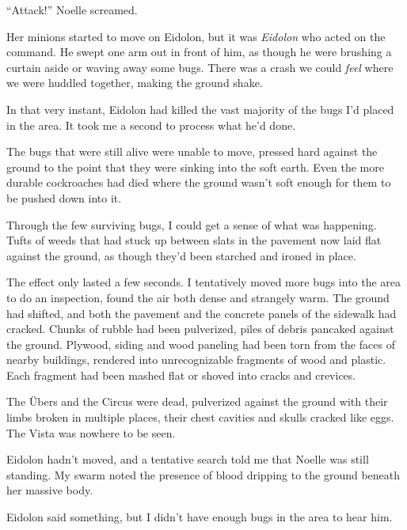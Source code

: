 ``Attack!'' Noelle screamed.



Her minions started to move on Eidolon, but it was \emph{Eidolon} who acted on the command.  He swept one arm out in front of him, as though he were brushing a curtain aside or waving away some bugs.  There was a crash we could \emph{feel} where we were huddled together, making the ground shake.



In that very instant, Eidolon had killed the vast majority of the bugs I'd placed in the area.  It took me a second to process what he'd done.



The bugs that were still alive were unable to move, pressed hard against the ground to the point that they were sinking into the soft earth.  Even the more durable cockroaches had died where the ground wasn't soft enough for them to be pushed down into it.



Through the few surviving bugs, I could get a sense of what was happening.  Tufts of weeds that had stuck up between slats in the pavement now laid flat against the ground, as though they'd been starched and ironed in place.



The effect only lasted a few seconds.  I tentatively moved more bugs into the area to do an inspection, found the air both dense and strangely warm.  The ground had shifted, and both the pavement and the concrete panels of the sidewalk had cracked.  Chunks of rubble had been pulverized, piles of debris pancaked against the ground.  Plywood, siding and wood paneling had been torn from the faces of nearby buildings, rendered into unrecognizable fragments of wood and plastic.  Each fragment had been mashed flat or shoved into cracks and crevices.



The \"{U}bers and the Circus were dead, pulverized against the ground with their limbs broken in multiple places, their chest cavities and skulls cracked like eggs.  The Vista was nowhere to be seen.



Eidolon hadn't moved, and a tentative search told me that Noelle was still standing.  My swarm noted the presence of blood dripping to the ground beneath her massive body.



Eidolon said something, but I didn't have enough bugs in the area to hear him.



